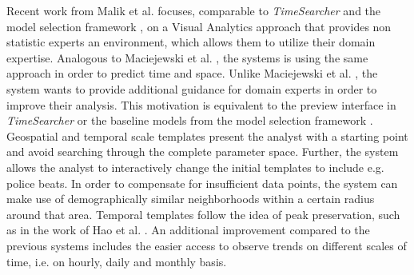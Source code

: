\documentclass[electronic]{vgtc}             %
\begin{document}
Recent work from Malik et al. \cite{malik:2014} focuses, comparable to \textit{TimeSearcher} \cite{buono:2005} and the model selection framework \cite{lu:2014}, on a Visual Analytics approach that provides non statistic experts an environment, which allows them to utilize their domain expertise.
Analogous to Maciejewski et al. \cite{maciejewski:2011, maciejewski:2010}, the systems is using the same approach in order to predict time and space.
Unlike Maciejewski et al. \cite{maciejewski:2011}, the system wants to provide additional guidance for domain experts in order to improve their analysis.
This motivation is equivalent to the preview interface in \textit{TimeSearcher} \cite{buono:2007} or the baseline models from the model selection framework \cite{lu:2014}.
Geospatial and temporal scale templates present the analyst with a starting point and avoid searching through the complete parameter space.
Further, the system allows the analyst to interactively change the initial templates to include e.g. police beats.
In order to compensate for insufficient data points, the system can make use of demographically similar neighborhoods within a certain radius around that area. 
Temporal templates follow the idea of peak preservation, such as in the work of Hao et al. \cite{Hao:2012}.
An additional improvement compared to the previous systems includes the easier access to observe trends on different scales of time, i.e. on hourly, daily and monthly basis.
\end{document}
